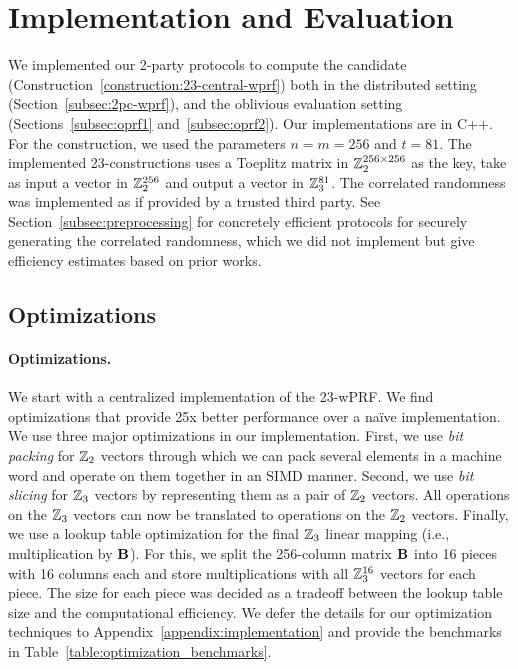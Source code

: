 \section{Implementation and Evaluation}
\label{sec:implementation_and_eval}
We implemented our 2-party protocols to compute the \ttwPRF candidate (Construction~\ref{construction:23-central-wprf}) both in the distributed setting (Section~\ref{subsec:2pc-wprf}), and the oblivious evaluation setting (Sections~\ref{subsec:oprf1} and~\ref{subsec:oprf2}). Our implementations are in C++. For the \ttwPRF construction, we used the parameters $n = m = 256$ and $t = 81$. The implemented 23-constructions uses a Toeplitz matrix in $\mathbb{Z}_2^{256 \times 256}$ as the key, take as input a vector in $\mathbb{Z}_2^{256}$ and output a vector in $\mathbb{Z}_3^{81}$. The correlated randomness was implemented as if provided by a trusted third party.  See Section~\ref{subsec:preprocessing} for concretely efficient protocols for securely generating the correlated randomness, which we did not implement but give efficiency estimates based on prior works. 

\iffull
\subsection{Optimizations}
\label{subsec:implementation_opt}
\else
\paragraph{Optimizations.}
We start with a centralized implementation of the 23-wPRF. We find optimizations that provide 25x better performance over a na\"ive implementation.
\iffull\else 
We use three major optimizations in our implementation. First, we use \textit{bit packing} for $\mathbb{Z}_2$ vectors through which we can pack several elements in a machine word and operate on them together in an SIMD manner. Second, we use \textit{bit slicing} for $\mathbb{Z}_3$ vectors by representing them as a pair of $\mathbb{Z}_2$ vectors. All operations on the $\mathbb{Z}_3$ vectors can now be translated to operations on the $\mathbb{Z}_2$ vectors. Finally, we use a lookup table optimization for the final $\mathbb{Z}_3$ linear mapping (i.e., multiplication by $\mat{B}$). For this, we split the 256-column matrix $\mat{B}$ into 16 pieces with 16 columns each and store multiplications with all $\mathbb{Z}_3^{16}$ vectors for each piece. The size for each piece was decided as a tradeoff between the lookup table size and the computational efficiency. We defer the details for our optimization techniques to Appendix~\ref{appendix:implementation} and provide the benchmarks in Table~\ref{table:optimization_benchmarks}.\fi

